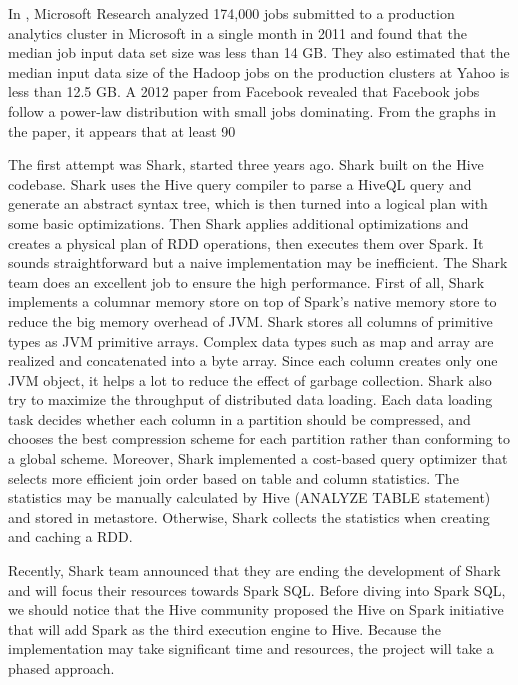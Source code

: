 \documentclass[11pt]{book}
\begin{document}
In \cite{Rowstron:2012:NEG}, Microsoft Research analyzed 174,000 jobs submitted to a production analytics cluster in Microsoft in a single month in 2011 and found that the median job input data set size was less than 14 GB. They also estimated that the median input data size of the Hadoop jobs on the production clusters at Yahoo is less than 12.5 GB. A 2012 paper from Facebook revealed that Facebook jobs follow a power-law distribution with small jobs dominating. From the graphs in the paper, it appears that at least 90%

The first attempt was Shark, started three years ago. Shark built on the Hive codebase. Shark uses the Hive query compiler to parse a HiveQL query and generate an abstract syntax tree, which is then turned into a logical plan with some basic optimizations. Then Shark applies additional optimizations and creates a physical plan of RDD operations, then executes them over Spark. It sounds straightforward but a naive implementation may be inefficient. The Shark team does an excellent job to ensure the high performance. First of all, Shark implements a columnar memory store on top of Spark's native memory store to reduce the big memory overhead of JVM. Shark stores all columns of primitive types as JVM primitive arrays. Complex data types such as map and array are realized and concatenated into a byte array. Since each column creates only one JVM object, it helps a lot to reduce the effect of garbage collection. Shark also try to maximize the throughput of distributed data loading. Each data loading task decides whether each column in a partition should be compressed, and chooses the best compression scheme for each partition rather than conforming to a global scheme. Moreover, Shark implemented a cost-based query optimizer that selects more efficient join order based on table and column statistics. The statistics may be manually calculated by Hive (ANALYZE TABLE statement) and stored in metastore. Otherwise, Shark collects the statistics when creating and caching a RDD.

Recently, Shark team announced that they are ending the development of Shark and will focus their resources towards Spark SQL. Before diving into Spark SQL, we should notice that the Hive community proposed the Hive on Spark initiative that will add Spark as the third execution engine to Hive. Because the implementation may take significant time and resources, the project will take a phased approach.
\end{document}
